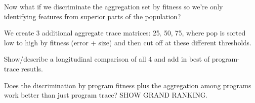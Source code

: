 Now what if we discriminate the aggregation set by fitness so we're only identifying features from superior parts of the population?

We create 3 additional  aggregate trace matrices: 25, 50, 75,  where pop is sorted low to high by fitness (error + size) and then cut off at these different thresholds. 

Show/describe a longitudinal comparison of all 4 and add in best of program-trace resutls.

Does the discrimination by program fitness plus the aggregation among programs work better than just program trace? SHOW GRAND RANKING.

%
